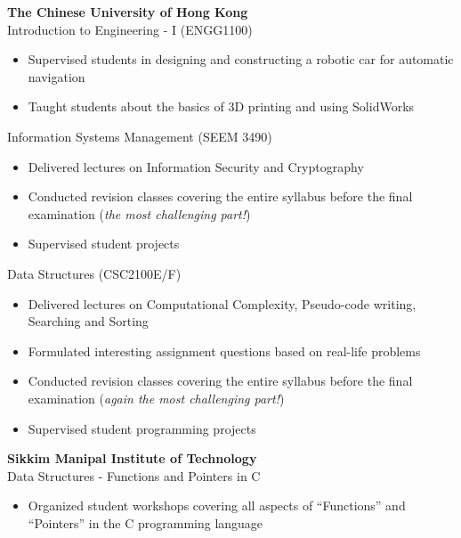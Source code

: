 \documentclass[margin]{res}
\begin{document}
\begin{resume}
\textbf{The Chinese University of Hong Kong}\\
Introduction to Engineering - I (ENGG1100)
\begin{itemize}\itemsep -3pt
\item Supervised students in designing and constructing a robotic car for automatic navigation
\item Taught students about the basics of 3D printing and using SolidWorks
\end{itemize}
Information Systems Management (SEEM 3490)
\begin{itemize}\itemsep -10pt
\item Delivered lectures on Information Security and Cryptography \\
\item Conducted revision classes covering the entire syllabus before the final examination (\textit{the most challenging part!}) \\
\item Supervised student projects
\end{itemize}
Data Structures (CSC2100E/F)
\begin{itemize}\itemsep -10pt
\item Delivered lectures on Computational Complexity, Pseudo-code writing, Searching and Sorting \\
\item Formulated interesting assignment questions based on real-life problems\\
\item Conducted revision classes covering the entire syllabus before the final examination (\textit{again the most challenging part!})\\
\item Supervised student programming projects
\end{itemize}
\textbf{Sikkim Manipal Institute of Technology}\\
Data Structures - Functions and Pointers in C
\begin{itemize}\itemsep -10pt
\item Organized student workshops covering all aspects of ``Functions'' and ``Pointers'' in the C programming language
\end{itemize}


\end{resume}
\end{document}
